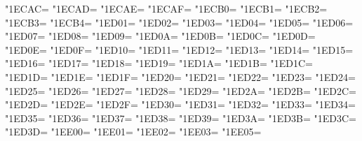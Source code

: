 \XeTeXcharclass"1ECAC=\KclassArabU
\XeTeXcharclass"1ECAD=\KclassArabU
\XeTeXcharclass"1ECAE=\KclassArabU
\XeTeXcharclass"1ECAF=\KclassArabU
\XeTeXcharclass"1ECB0=\KclassArabU
\XeTeXcharclass"1ECB1=\KclassArabU
\XeTeXcharclass"1ECB2=\KclassArabU
\XeTeXcharclass"1ECB3=\KclassArabU
\XeTeXcharclass"1ECB4=\KclassArabU
\XeTeXcharclass"1ED01=\KclassArabU
\XeTeXcharclass"1ED02=\KclassArabU
\XeTeXcharclass"1ED03=\KclassArabU
\XeTeXcharclass"1ED04=\KclassArabU
\XeTeXcharclass"1ED05=\KclassArabU
\XeTeXcharclass"1ED06=\KclassArabU
\XeTeXcharclass"1ED07=\KclassArabU
\XeTeXcharclass"1ED08=\KclassArabU
\XeTeXcharclass"1ED09=\KclassArabU
\XeTeXcharclass"1ED0A=\KclassArabU
\XeTeXcharclass"1ED0B=\KclassArabU
\XeTeXcharclass"1ED0C=\KclassArabU
\XeTeXcharclass"1ED0D=\KclassArabU
\XeTeXcharclass"1ED0E=\KclassArabU
\XeTeXcharclass"1ED0F=\KclassArabU
\XeTeXcharclass"1ED10=\KclassArabU
\XeTeXcharclass"1ED11=\KclassArabU
\XeTeXcharclass"1ED12=\KclassArabU
\XeTeXcharclass"1ED13=\KclassArabU
\XeTeXcharclass"1ED14=\KclassArabU
\XeTeXcharclass"1ED15=\KclassArabU
\XeTeXcharclass"1ED16=\KclassArabU
\XeTeXcharclass"1ED17=\KclassArabU
\XeTeXcharclass"1ED18=\KclassArabU
\XeTeXcharclass"1ED19=\KclassArabU
\XeTeXcharclass"1ED1A=\KclassArabU
\XeTeXcharclass"1ED1B=\KclassArabU
\XeTeXcharclass"1ED1C=\KclassArabU
\XeTeXcharclass"1ED1D=\KclassArabU
\XeTeXcharclass"1ED1E=\KclassArabU
\XeTeXcharclass"1ED1F=\KclassArabU
\XeTeXcharclass"1ED20=\KclassArabU
\XeTeXcharclass"1ED21=\KclassArabU
\XeTeXcharclass"1ED22=\KclassArabU
\XeTeXcharclass"1ED23=\KclassArabU
\XeTeXcharclass"1ED24=\KclassArabU
\XeTeXcharclass"1ED25=\KclassArabU
\XeTeXcharclass"1ED26=\KclassArabU
\XeTeXcharclass"1ED27=\KclassArabU
\XeTeXcharclass"1ED28=\KclassArabU
\XeTeXcharclass"1ED29=\KclassArabU
\XeTeXcharclass"1ED2A=\KclassArabU
\XeTeXcharclass"1ED2B=\KclassArabU
\XeTeXcharclass"1ED2C=\KclassArabU
\XeTeXcharclass"1ED2D=\KclassArabU
\XeTeXcharclass"1ED2E=\KclassArabU
\XeTeXcharclass"1ED2F=\KclassArabU
\XeTeXcharclass"1ED30=\KclassArabU
\XeTeXcharclass"1ED31=\KclassArabU
\XeTeXcharclass"1ED32=\KclassArabU
\XeTeXcharclass"1ED33=\KclassArabU
\XeTeXcharclass"1ED34=\KclassArabU
\XeTeXcharclass"1ED35=\KclassArabU
\XeTeXcharclass"1ED36=\KclassArabU
\XeTeXcharclass"1ED37=\KclassArabU
\XeTeXcharclass"1ED38=\KclassArabU
\XeTeXcharclass"1ED39=\KclassArabU
\XeTeXcharclass"1ED3A=\KclassArabU
\XeTeXcharclass"1ED3B=\KclassArabU
\XeTeXcharclass"1ED3C=\KclassArabU
\XeTeXcharclass"1ED3D=\KclassArabU
\XeTeXcharclass"1EE00=\KclassArabU
\XeTeXcharclass"1EE01=\KclassArabU
\XeTeXcharclass"1EE02=\KclassArabU
\XeTeXcharclass"1EE03=\KclassArabU
\XeTeXcharclass"1EE05=\KclassArabU
